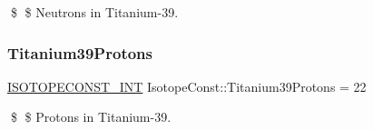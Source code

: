 \$ \$ Neutrons in Titanium-\/39. \mbox{\label{group___isotope_const-_titanium-_ti39_gacecaa102e141cd2e906628c3f926b6f5}} 
\subsubsection{\texorpdfstring{Titanium39\+Protons}{Titanium39Protons}}
{\footnotesize\ttfamily \mbox{\hyperlink{group___isotope_const-_macros_ga5f18360b3e99483a35c32d789e62621c}{I\+S\+O\+T\+O\+P\+E\+C\+O\+N\+S\+T\+\_\+\+I\+NT}} Isotope\+Const\+::\+Titanium39\+Protons = 22}

\$ \$ Protons in Titanium-\/39. 